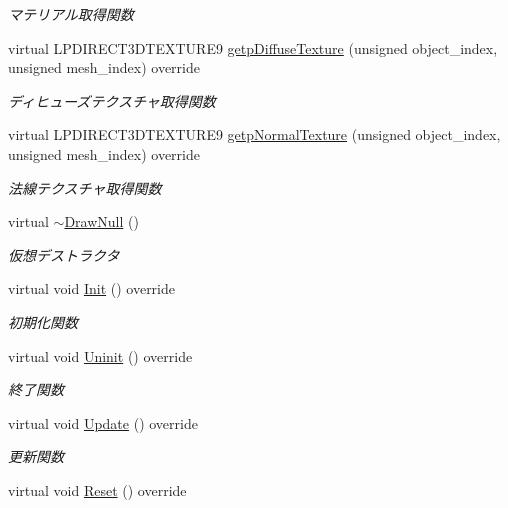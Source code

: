 \begin{DoxyCompactItemize}
\begin{DoxyCompactList}\small\item\em マテリアル取得関数 \end{DoxyCompactList}\item 
virtual L\+P\+D\+I\+R\+E\+C\+T3\+D\+T\+E\+X\+T\+U\+R\+E9 \mbox{\hyperlink{class_draw_null_a98cc7cd43b19d9d70cc621d23d89286f}{getp\+Diffuse\+Texture}} (unsigned object\+\_\+index, unsigned mesh\+\_\+index) override
\begin{DoxyCompactList}\small\item\em ディヒューズテクスチャ取得関数 \end{DoxyCompactList}\item 
virtual L\+P\+D\+I\+R\+E\+C\+T3\+D\+T\+E\+X\+T\+U\+R\+E9 \mbox{\hyperlink{class_draw_null_abdb03713b973fd1f65c914fa146414a1}{getp\+Normal\+Texture}} (unsigned object\+\_\+index, unsigned mesh\+\_\+index) override
\begin{DoxyCompactList}\small\item\em 法線テクスチャ取得関数 \end{DoxyCompactList}\item 
virtual \mbox{\hyperlink{class_draw_null_af03c2d730ff3351baf234f89cc28303b}{$\sim$\+Draw\+Null}} ()
\begin{DoxyCompactList}\small\item\em 仮想デストラクタ \end{DoxyCompactList}\item 
virtual void \mbox{\hyperlink{class_draw_null_a20aef1e54c1a158b741bfd731e18efdf}{Init}} () override
\begin{DoxyCompactList}\small\item\em 初期化関数 \end{DoxyCompactList}\item 
virtual void \mbox{\hyperlink{class_draw_null_a6e81d63efab7333e8d0e8af99362a4d9}{Uninit}} () override
\begin{DoxyCompactList}\small\item\em 終了関数 \end{DoxyCompactList}\item 
virtual void \mbox{\hyperlink{class_draw_null_ad32a508d269de7eda8ad24ea72230464}{Update}} () override
\begin{DoxyCompactList}\small\item\em 更新関数 \end{DoxyCompactList}\item 
virtual void \mbox{\hyperlink{class_draw_null_a1e295d7fa2d2b78cfe3121e0a0fcd799}{Reset}} () override

\end{DoxyCompactItemize}
